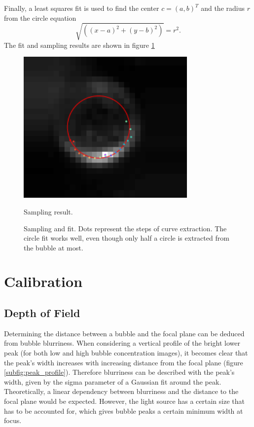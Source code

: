 				
				Finally, a least squares fit is used to find the center $c = (a,b)^T$ and the radius $r$ from the circle equation
				\begin{equation}
					\sqrt{ \left( (x-a)^2 + (y-b)^2 \right)} = r^2.
				\end{equation}
				The fit and sampling results are shown in figure \ref{fig:fit_circle_fit_result}
				
				\begin{figure}
						\centering
						\includegraphics[scale=.8]{images/sampling_result_fit.png}
						\caption{Sampling result. }
						\label{fig:sampling_result}								
					\caption{Sampling and fit. Dots represent the steps of curve extraction. 
					The circle fit works well, even though only half a circle is extracted from the bubble at most. }
					\label{fig:fit_circle_fit_result}
				\end{figure}
				

	
	
	
	
	\section{Calibration}\label{calibration_algorithm}
		\subsection{Depth of Field}
			Determining the distance between a bubble and the focal plane can be deduced from bubble blurriness. When considering a vertical profile of the bright lower peak (for both low and high bubble concentration images), it becomes clear that the peak's width increases with increasing distance from the focal plane (figure \ref{subfig:peak_profile}). Therefore blurriness can be described with the peak's width, given by the sigma parameter of a Gaussian fit around the peak. Theoretically, a linear dependency between blurriness and the distance to the focal plane would be expected. However, the light source has a certain size that has to be accounted for, which gives bubble peaks a certain minimum width at focus. 
			
